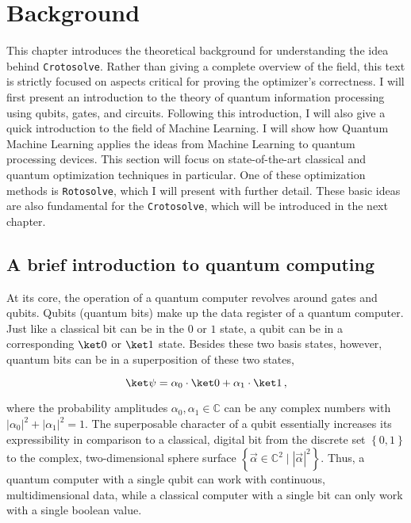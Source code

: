 \chapter{Background}
\label{chap:background}

This chapter introduces the theoretical background for understanding the idea
behind \texttt{Crotosolve}.
Rather than giving a complete overview of the field, this text is strictly
focused on aspects critical for proving the optimizer's correctness.
I will first present an introduction to the theory of quantum information
processing using qubits, gates, and circuits.
Following this introduction, I will also give a quick introduction to the field
of Machine Learning.
I will show how Quantum Machine Learning applies the ideas from Machine Learning
to quantum processing devices.
This section will focus on state-of-the-art classical and quantum optimization
techniques in particular.
One of these optimization methods is \texttt{Rotosolve}, which I will present
with further detail.
These basic ideas are also fundamental for the \texttt{Crotosolve}, which will
be introduced in the next chapter.

\section{A brief introduction to quantum computing}
\label{sec:quantum-intro}
At its core, the operation of a quantum computer revolves around gates and
qubits.
Qubits (quantum bits) make up the data register of a quantum computer.
Just like a classical bit can be in the $0$ or $1$ state, a qubit can be in a
corresponding $\ket 0$ or $\ket 1$ state.
Besides these two basis states, however, quantum bits can be in a superposition
of these two states,

$$\ket \psi = \alpha_0 \cdot \ket 0 + \alpha_1 \cdot \ket 1\,,$$

where the probability amplitudes $\alpha_0, \alpha_1 \in \mathbb C$ can be any
complex numbers with $\left|\alpha_0\right|^2 + \left|\alpha_1\right|^2 = 1$.
The superposable character of a qubit essentially increases its expressibility
in comparison to a classical, digital bit from the discrete set
$\left\{0, 1\right\}$ to the complex, two-dimensional sphere surface
$\left\{\vec \alpha \in \mathbb C^2 \mid \left|\vec\alpha\right|^2\right\}$.
Thus, a quantum computer with a single qubit can work with continuous,
multidimensional data, while a classical computer with a single bit can only
work with a single boolean value.

